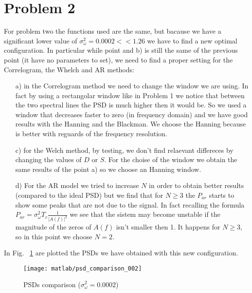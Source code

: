 \documentclass{article}
\begin{document}
\section*{Problem 2}
For problem two the functions used are the same, but bacause we have a significant lower value of $\sigma_\omega^2 = 0.0002 << 1.26$ we have to find a new optimal configuration. In particular while point and b) is still the same of the previous point (it have no parameters to set), we need to find a proper setting for the Correlogram, the Whelch and AR methods:
\begin{itemize}
 \item[a)] in the Correlogram method we need to change the window we are using. In fact by using a rectangolar window like in Problem 1 we notice that between the two spectral lines the PSD is much higher then it would be. So we used a window that decreases faster to zero (in frequency domain) and we have good results with the Hanning and the Blackman. We choose the Hanning because is better with reguards of the frequency resolution.
 \item[c)] for the Welch method, by testing, we don't find relaevant differeces by changing the values of $D$ or $S$. For the choise of the window we obtain the same results of the point a) so we choose an Hanning window.
 \item[d)] For the AR model we tried to increase $N$ in order to obtain better results (compared to the ideal PSD) but we find that for $N\geq 3$ the $P_{ar}$ starts to show some peaks that are not due to the signal. In fact recalling the formula $P_{ar} = \sigma_\omega^2 T_c \frac{1}{|A(f)|^2}$ we see that the sistem may become unstable if the magnitude of the zeros of $A(f)$ isn't smaller then 1. It happens for $N\geq3$, so in this point we choose $N=2$. 
\end{itemize}
In Fig. ~\ref{plot:psd_comparison_002} are plotted the PSDs we have obtained with this new configuration.
\begin{figure}[htbp]
  \centering
  \texttt{[image: matlab/psd\_comparison\_002]}
  \caption{PSDs comparison ($\sigma_\omega^2 = 0.0002$)}
  \label{plot:psd_comparison_002}
\end{figure}
\end{document}
